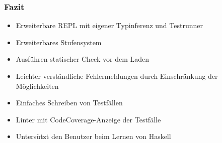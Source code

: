 \begin{frame}
	\frametitle{Fazit}
	\begin{itemize}
		\item{Erweiterbare REPL mit eigener Typinferenz und Testrunner}
		\item{Erweiterbares Stufensystem}
		\item{Ausführen statischer Check vor dem Laden}
		\item{Leichter verständliche Fehlermeldungen durch Einschränkung der Möglichkeiten}
		\item{Einfaches Schreiben von Testfällen}
		\item{Linter mit CodeCoverage-Anzeige der Testfälle}
		\item{Untersützt den Benutzer beim Lernen von Haskell}
	\end{itemize}
\end{frame}